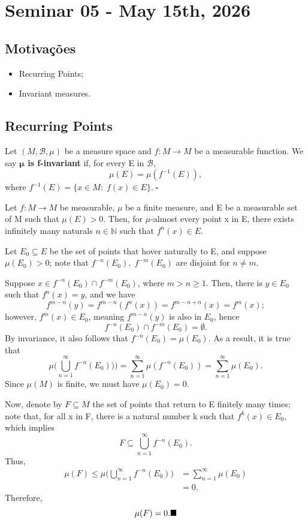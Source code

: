 \documentclass[../fractals_everywhere.tex]{subfiles}
\begin{document}
\section{Seminar 05 - May 15th, 2026}
\subsection{Motivações}
\begin{itemize}
	\item Recurring Points;
	\item Invariant measures.
\end{itemize}
\subsection{Recurring Points}
\begin{def*}
	Let \((M, \mathcal{B}, \mu )\) be a measure space and \(f:M\rightarrow M\) be a measurable function. We say \textbf{\(\mathbf{\mu }\) is f-invariant} if, for every E in \(\mathcal{B}\),
	\[
		\mu (E) = \mu (f^{-1}(E)),
	\]
	where \(f^{-1}(E)=\{x\in M:\; f(x)\in E\}.\; \square\)
\end{def*}
\begin{theorem*}
	Let \(f:M\rightarrow M\) be measurable, \(\mu \) be a finite measure, and E be a measurable set of M such that \(\mu (E) > 0\). Then, for \(\mu\)-almost every point x in E, there exists infinitely many naturals \(n\in \mathbb{N}\) such that \(f^{n}(x)\in E.\)
\end{theorem*}
\begin{proof*}
	Let \(E_{0}\subseteq E\) be the set of points that hover naturally to E, and suppose \(\mu (E_{0})>0\); note that \(f^{-n}(E_{0}), \; f^{-m}(E_{0})\) are disjoint for \(n\neq m\).

	Suppose \(x\in f^{-n}(E_{0})\cap f^{-m}(E_{0})\), where \(m > n \geq 1\). Then, there is \(y\in E_{0}\) such that \(f^{n}(x) = y\), and we have
	\[
		f^{m-n}(y) = f^{m-n}(f^{n}(x)) = f^{m-n+n}(x) = f^{m}(x);
	\]
	however, \(f^{m}(x)\in E_{0}\), meaning \(f^{m-n}(y)\) is also in \(E_{0}\), hence
	\[
		f^{-n}(E_{0})\cap f^{-m}(E_{0})=\emptyset .
	\]
	By invariance, it also follows that \(f^{-n}(E_{0}) = \mu (E_{0})\). As a result, it is true that
	\[
		\mu \biggl(\bigcup_{n=1}^{\infty}f^{-n}(E_{0}))\biggr) = \sum\limits_{n=1}^{\infty}\mu (f^{-n}(E_{0})) = \sum\limits_{n=1}^{\infty}\mu (E_{0}).
	\]
	Since \(\mu (M)\) is finite, we must have \(\mu (E_{0}) = 0\).

	Now, denote by \(F\subseteq M\) the set of points that return to E finitely many times; note that, for all x in F, there is a natural number k such that \(f^{k}(x)\in E_{0}\), which implies
	\[
		F\subseteq \bigcup_{n=1}^{\infty}f^{-n}(E_{0}).
	\]
	Thus,
	\begin{align*}
		\mu (F)\leq \mu \biggl(\bigcup_{n=1}^{\infty}f^{-n}(E_{0})\biggr) & = \sum\limits_{n=1}^{\infty}\mu (E_{0}) \\
		                                                                  & = 0.
	\end{align*}
	Therefore,
	\[
		\mu (F) = 0. \text{$\blacksquare$}
	\]
\end{proof*}
\end{document}

